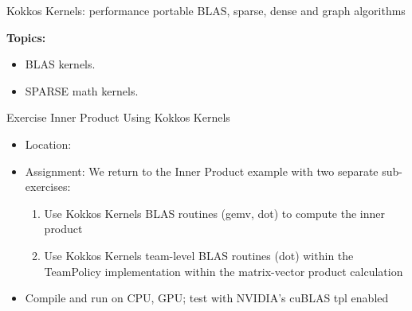 




\begin{frame}[fragile]

  {\Huge Kokkos Kernels: performance portable BLAS, sparse, dense and graph algorithms}
  \vspace{20pt}

  \textbf{Topics:}
  \begin{itemize}
    \item {BLAS kernels.}
    \item {SPARSE math kernels.}
  \end{itemize}

  \vspace{-20pt}

\end{frame}




\begin{frame}[fragile]{Exercise Inner Product Using Kokkos Kernels}

  \begin{small}
  \begin{itemize}
  \item Location: 
  \item Assignment: We return to the Inner Product example with two separate sub-exercises:
  \begin{enumerate}
    \item  Use Kokkos Kernels BLAS routines (gemv, dot) to compute the inner product
    \item  Use Kokkos Kernels team-level BLAS routines (dot) within the TeamPolicy implementation within the matrix-vector product calculation
  \end{enumerate}
  \item Compile and run on CPU, GPU; test with NVIDIA's cuBLAS tpl enabled
  \end{itemize}
  \end{small}

\end{frame}

